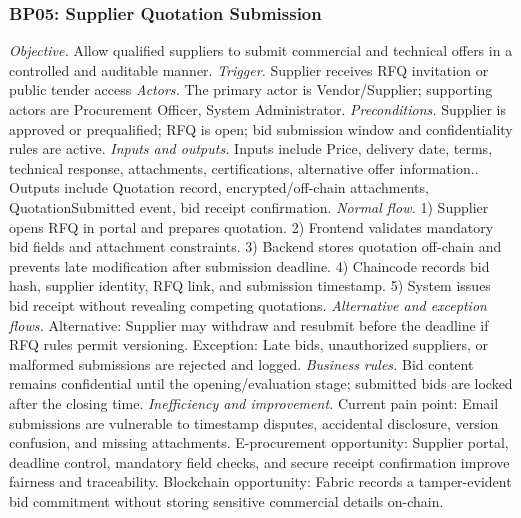 \documentclass[conference]{IEEEtran}
\begin{document}
\subsubsection{BP05: Supplier Quotation Submission}
\textit{Objective.} Allow qualified suppliers to submit commercial and technical offers in a controlled and auditable manner.
\textit{Trigger.} Supplier receives RFQ invitation or public tender access
\textit{Actors.} The primary actor is Vendor/Supplier; supporting actors are Procurement Officer, System Administrator.
\textit{Preconditions.} Supplier is approved or prequalified; RFQ is open; bid submission window and confidentiality rules are active.
\textit{Inputs and outputs.} Inputs include Price, delivery date, terms, technical response, attachments, certifications, alternative offer information.. Outputs include Quotation record, encrypted/off-chain attachments, QuotationSubmitted event, bid receipt confirmation.
\textit{Normal flow.} 1) Supplier opens RFQ in portal and prepares quotation. 2) Frontend validates mandatory bid fields and attachment constraints. 3) Backend stores quotation off-chain and prevents late modification after submission deadline. 4) Chaincode records bid hash, supplier identity, RFQ link, and submission timestamp. 5) System issues bid receipt without revealing competing quotations.
\textit{Alternative and exception flows.} Alternative: Supplier may withdraw and resubmit before the deadline if RFQ rules permit versioning. Exception: Late bids, unauthorized suppliers, or malformed submissions are rejected and logged.
\textit{Business rules.} Bid content remains confidential until the opening/evaluation stage; submitted bids are locked after the closing time.
\textit{Inefficiency and improvement.} Current pain point: Email submissions are vulnerable to timestamp disputes, accidental disclosure, version confusion, and missing attachments. E-procurement opportunity: Supplier portal, deadline control, mandatory field checks, and secure receipt confirmation improve fairness and traceability. Blockchain opportunity: Fabric records a tamper-evident bid commitment without storing sensitive commercial details on-chain.
\end{document}
